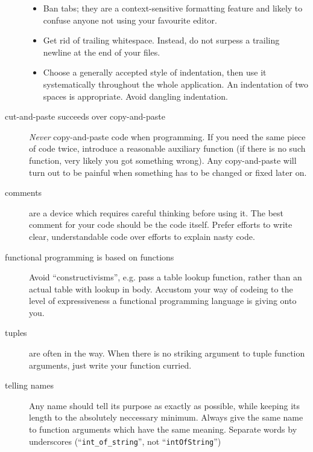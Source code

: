 \begin{isabellebody}
\begin{isamarkuptext}
\begin{description}
\begin{itemize}
        \item Ban tabs; they are a context-sensitive formatting
          feature and likely to confuse anyone not using your
          favourite editor.

        \item Get rid of trailing whitespace.  Instead, do not
          surpess a trailing newline at the end of your files.

        \item Choose a generally accepted style of indentation,
          then use it systematically throughout the whole
          application.  An indentation of two spaces is appropriate.
          Avoid dangling indentation.

      \end{itemize}

    \item[cut-and-paste succeeds over copy-and-paste]
      \emph{Never} copy-and-paste code when programming.  If you
        need the same piece of code twice, introduce a
        reasonable auxiliary function (if there is no
        such function, very likely you got something wrong).
        Any copy-and-paste will turn out to be painful 
        when something has to be changed or fixed later on.

    \item[comments]
      are a device which requires careful thinking before using
      it.  The best comment for your code should be the code itself.
      Prefer efforts to write clear, understandable code
      over efforts to explain nasty code.

    \item[functional programming is based on functions]
      Avoid ``constructivisms'', e.g. pass a table lookup function,
      rather than an actual table with lookup in body.  Accustom
      your way of codeing to the level of expressiveness
      a functional programming language is giving onto you.

    \item[tuples]
      are often in the way.  When there is no striking argument
      to tuple function arguments, just write your function curried.

    \item[telling names]
      Any name should tell its purpose as exactly as possible,
      while keeping its length to the absolutely neccessary minimum.
      Always give the same name to function arguments which
      have the same meaning. Separate words by underscores
      (``\verb|int_of_string|'', not ``\verb|intOfString|'')


\end{description}
\end{isamarkuptext}
\end{isabellebody}
